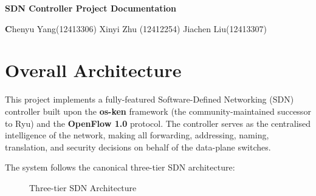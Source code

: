 \documentclass[12pt,a4paper]{article}
\begin{document}
\begin{center}
{\Large\bfseries SDN Controller Project Documentation}

\vspace{0.2cm}

\textbf Chenyu Yang(12413306) Xinyi Zhu (12412254) Jiachen Liu(12413307)
\end{center}



\section{Overall Architecture}

This project implements a fully-featured Software-Defined Networking (SDN) controller built upon the \textbf{os-ken} framework (the community-maintained successor to Ryu) and the \textbf{OpenFlow 1.0} protocol. The controller serves as the centralised intelligence of the network, making all forwarding, addressing, naming, translation, and security decisions on behalf of the data-plane switches.

The system follows the canonical three-tier SDN architecture:

\begin{figure}[H]
\centering
{}
\caption{Three-tier SDN Architecture}
\end{figure}
\end{document}

